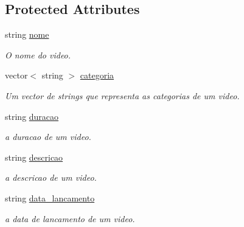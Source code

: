 \subsection*{Protected Attributes}
\begin{DoxyCompactItemize}
\item 
string \hyperlink{classVideo_a6b49d73a9ec7d7b99ef5c809f94514ca}{nome}\hypertarget{classVideo_a6b49d73a9ec7d7b99ef5c809f94514ca}{}\label{classVideo_a6b49d73a9ec7d7b99ef5c809f94514ca}

\begin{DoxyCompactList}\small\item\em O nome do video. \end{DoxyCompactList}\item 
vector$<$ string $>$ \hyperlink{classVideo_a8ff58ab1ddf14d474ea7174b13ed05b4}{categoria}\hypertarget{classVideo_a8ff58ab1ddf14d474ea7174b13ed05b4}{}\label{classVideo_a8ff58ab1ddf14d474ea7174b13ed05b4}

\begin{DoxyCompactList}\small\item\em Um vector de strings que representa as categorias de um video. \end{DoxyCompactList}\item 
string \hyperlink{classVideo_a1dec1f3fc1f160b6ae4210bdeca1eaf0}{duracao}\hypertarget{classVideo_a1dec1f3fc1f160b6ae4210bdeca1eaf0}{}\label{classVideo_a1dec1f3fc1f160b6ae4210bdeca1eaf0}

\begin{DoxyCompactList}\small\item\em a duracao de um video. \end{DoxyCompactList}\item 
string \hyperlink{classVideo_a4bf01d0dcbd8ac417c65755fe1a60f2d}{descricao}\hypertarget{classVideo_a4bf01d0dcbd8ac417c65755fe1a60f2d}{}\label{classVideo_a4bf01d0dcbd8ac417c65755fe1a60f2d}

\begin{DoxyCompactList}\small\item\em a descricao de um video. \end{DoxyCompactList}\item 
string \hyperlink{classVideo_a90f3f4e7d9564a225445acc6248f15d9}{data\+\_\+lancamento}\hypertarget{classVideo_a90f3f4e7d9564a225445acc6248f15d9}{}\label{classVideo_a90f3f4e7d9564a225445acc6248f15d9}

\begin{DoxyCompactList}\small\item\em a data de lancamento de um video. \end{DoxyCompactList}\end{DoxyCompactItemize}


